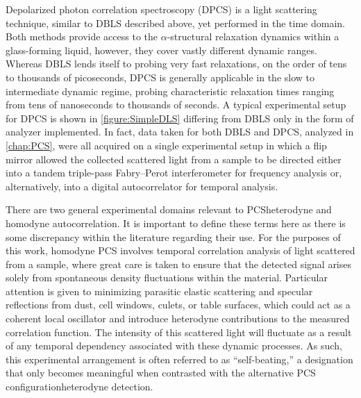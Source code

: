 Depolarized photon correlation spectroscopy (DPCS) is a light scattering technique, similar to DBLS described above, yet performed in the time domain. Both methods provide access to the $\alpha$-structural relaxation dynamics within a glass-forming liquid, however, they cover vastly different dynamic ranges. Whereas DBLS lends itself to probing very fast relaxations, on the order of tens to thousands of picoseconds, DPCS is generally applicable in the slow to intermediate dynamic regime, probing characteristic relaxation times ranging from tens of nanoseconds to thousands of seconds. A typical experimental setup for DPCS is shown in \fig \nolinebreak \ref{figure:SimpleDLS} \textemdash differing from DBLS only in the form of analyzer implemented. In fact, data taken for both DBLS and DPCS, analyzed in \chap \nolinebreak \ref{chap:PCS}, were all acquired on a single experimental setup in which a flip mirror allowed the collected scattered light from a sample to be directed either into a tandem triple-pass Fabry–Perot interferometer for frequency analysis or, alternatively, into a digital autocorrelator for temporal analysis.

There are two general experimental domains relevant to PCS\textemdash heterodyne and homodyne autocorrelation. It is important to define these terms here as there is some discrepancy within the literature regarding their use.  For the purposes of this work, homodyne PCS involves temporal correlation analysis of light scattered from a sample, where great care is taken to ensure that the detected signal arises solely from spontaneous density fluctuations within the material. Particular attention is given to minimizing parasitic elastic scattering and specular reflections from dust, cell windows, culets, or table surfaces, which could act as a coherent local oscillator and introduce heterodyne contributions to the measured correlation function.  The intensity of this scattered light will fluctuate as a result of any temporal dependency associated with these dynamic processes.  As such, this experimental arrangement is often referred to as ``self-beating,'' a designation that only becomes meaningful when contrasted with the alternative PCS configuration\textemdash heterodyne detection.

